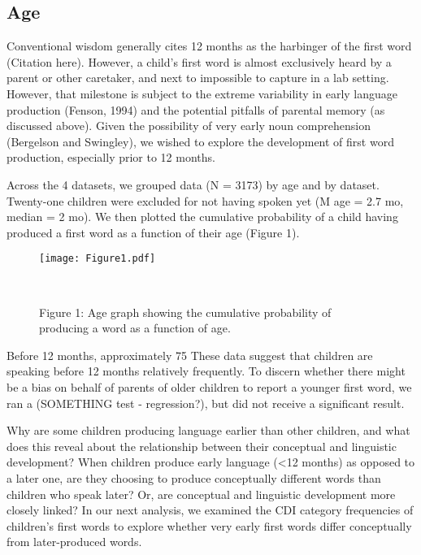 \documentclass[10pt,letterpaper]{article}
\begin{document}
\subsection{Age} 
Conventional wisdom generally cites 12 months as the harbinger of the first word (Citation here). However, a child's first word is almost exclusively heard by a parent or other caretaker, and next to impossible to capture in a lab setting. However, that milestone is subject to the extreme variability in early language production (Fenson, 1994) and the potential pitfalls of parental memory (as discussed above). Given the possibility of very early noun comprehension (Bergelson and Swingley), we wished to explore the development of first word production, especially prior to 12 months.  \par
Across the 4 datasets, we grouped data (N = 3173) by age and by dataset. Twenty-one children were excluded for not having spoken yet (M age  = 2.7 mo, median = 2 mo). We then plotted the cumulative probability of a child having produced a first word as a function of their age (Figure 1).

\begin{figure}[t]
\begin{center}
\texttt{[image: Figure1.pdf]}
\end{center}
\caption{Figure 1: Age graph showing the cumulative probability of producing a word as a function of age.}\
\end{figure}

Before 12 months, approximately 75%
These data suggest that children are speaking before 12 months relatively frequently. To discern whether there might be a bias on behalf of parents of older children to report a younger first word, we ran a (SOMETHING test - regression?), but did not receive a significant result. \par
Why are some children producing language earlier than other children, and what does this reveal about the relationship between their conceptual and linguistic development? When children produce early language (<12 months) as opposed to a later one, are they choosing to produce conceptually different words than children who speak later? Or, are conceptual and linguistic development more closely linked? In our next analysis, we examined the CDI category frequencies of children's first words to explore whether very early first words differ conceptually from later-produced words. 
\end{document}
